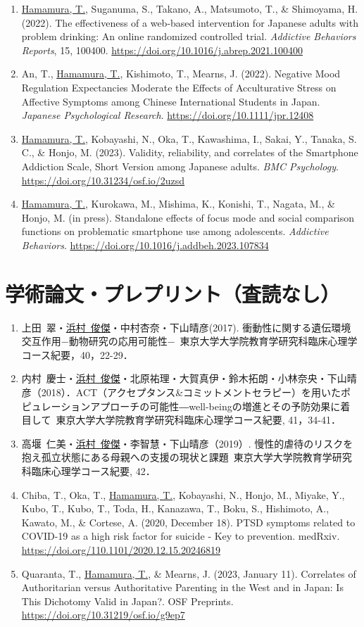 \documentclass[11pt,a4paper]{article}
\begin{document}
\begin{enumerate}
	\item \underline{Hamamura, T.}, Suganuma, S., Takano, A., Matsumoto, T., \& Shimoyama, H. (2022). The effectiveness of a web-based intervention for Japanese adults with problem drinking: An online randomized controlled trial. \textit{Addictive Behaviors Reports}, 15, 100400. \url{https://doi.org/10.1016/j.abrep.2021.100400}
	\item An, T., \underline{Hamamura, T.}, Kishimoto, T., Mearns, J. (2022). Negative Mood Regulation Expectancies Moderate the Effects of Acculturative Stress on Affective Symptoms among Chinese International Students in Japan. \textit{Japanese Psychological Research}. \url{https://doi.org/10.1111/jpr.12408}
	\item \underline{Hamamura, T.}, Kobayashi, N., Oka, T., Kawashima, I., Sakai, Y., Tanaka, S. C., \& Honjo, M. (2023). Validity, reliability, and correlates of the Smartphone Addiction Scale, Short Version among Japanese adults. \textit{BMC Psychology}. \url{https://doi.org/10.31234/osf.io/2uzsd}
	\item \underline{Hamamura, T.}, Kurokawa, M., Mishima, K., Konishi, T., Nagata, M., \& Honjo, M. (in press). Standalone effects of focus mode and social comparison functions on problematic smartphone use among adolescents. \textit{Addictive Behaviors}. \url{https://doi.org/10.1016/j.addbeh.2023.107834}
\end{enumerate}

\section{学術論文・プレプリント（査読なし）}
\begin{enumerate}
	\item 上田\ 翠・\underline{浜村\ 俊傑}・中村杏奈・下山晴彦(2017). 衝動性に関する遺伝環境交互作用−動物研究の応用可能性−\ 東京大学大学院教育学研究科臨床心理学コース紀要，40，22-29．
	\item 内村\ 慶士・\underline{浜村\ 俊傑}・北原祐理・大賀真伊・鈴木拓朗・小林奈央・下山晴彦（2018）．ACT（アクセプタンス\&コミットメントセラピー）を用いたポピュレーションアプローチの可能性―well-beingの増進とその予防効果に着目して\ 東京大学大学院教育学研究科臨床心理学コース紀要, 41，34-41．
	\item 高堰\ 仁美・\underline{浜村\ 俊傑}・李智慧・下山晴彦（2019）. 慢性的虐待のリスクを抱え孤立状態にある母親への支援の現状と課題\ 東京大学大学院教育学研究科臨床心理学コース紀要, 42．
	\item Chiba, T., Oka, T., \underline{Hamamura, T.}, Kobayashi, N., Honjo, M., Miyake, Y., Kubo, T., Kubo, T., Toda, H., Kanazawa, T., Boku, S., Hishimoto, A., Kawato, M., \& Cortese, A. (2020, December 18). PTSD symptoms related to COVID-19 as a high risk factor for suicide - Key to prevention. medRxiv. \url{https://doi.org/110.1101/2020.12.15.20246819}
	\item Quaranta, T., \underline{Hamamura, T.}, \& Mearns, J. (2023, January 11). Correlates of Authoritarian versus Authoritative Parenting in the West and in Japan: Is This Dichotomy Valid in Japan?. OSF Preprints. \url{https://doi.org/10.31219/osf.io/g9ep7}
\end{enumerate}
\end{document}
